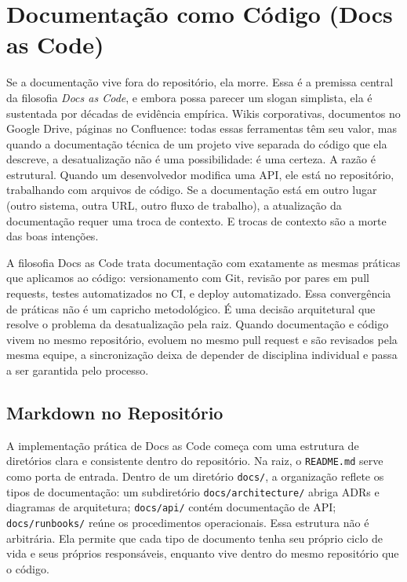 \section{Documentação como Código (Docs as Code)}

Se a documentação vive fora do repositório, ela morre. Essa é a
premissa central da filosofia \textit{Docs as Code}, e embora possa
parecer um slogan simplista, ela é sustentada por décadas de
evidência empírica. Wikis corporativas, documentos no Google Drive,
páginas no Confluence: todas essas ferramentas têm seu valor, mas
quando a documentação técnica de um projeto vive separada do código
que ela descreve, a desatualização não é uma possibilidade: é uma
certeza. A razão é estrutural. Quando um desenvolvedor modifica uma
API, ele está no repositório, trabalhando com arquivos de código. Se
a documentação está em outro lugar (outro sistema, outra URL, outro
fluxo de trabalho), a atualização da documentação requer uma troca
de contexto. E trocas de contexto são a morte das boas intenções.

A filosofia Docs as Code trata documentação com exatamente as mesmas
práticas que aplicamos ao código: versionamento com Git, revisão por
pares em pull requests, testes automatizados no CI, e deploy
automatizado. Essa convergência de práticas não é um capricho
metodológico. É uma decisão arquitetural que resolve o problema
da desatualização pela raiz. Quando documentação e código vivem no
mesmo repositório, evoluem no mesmo pull request e são revisados pela
mesma equipe, a sincronização deixa de depender de disciplina individual
e passa a ser garantida pelo processo.


\subsection{Markdown no Repositório}

A implementação prática de Docs as Code começa com uma estrutura de
diretórios clara e consistente dentro do repositório. Na raiz, o
\texttt{README.md} serve como porta de entrada. Dentro de um diretório
\texttt{docs/}, a organização reflete os tipos de documentação: um
subdiretório \texttt{docs/architecture/} abriga ADRs e diagramas de
arquitetura; \texttt{docs/api/} contém documentação de API;
\texttt{docs/runbooks/} reúne os procedimentos operacionais. Essa
estrutura não é arbitrária. Ela permite que cada tipo de documento
tenha seu próprio ciclo de vida e seus próprios responsáveis, enquanto
vive dentro do mesmo repositório que o código.

